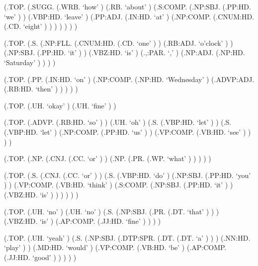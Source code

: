 \documentclass[10pt]{article}
\begin{document}
\begin{parsetree}  (.TOP. (.SUGG. (.WRB. `how' ) (.RB. `about' ) (.S:COMP. (.NP:SBJ. (.PP:HD. `we' ) ) (.VBP:HD. `leave' ) (.PP:ADJ. (.IN:HD. `at' ) (.NP:COMP. (.CNUM:HD. (.CD. `eight' ) ) ) ) ) ) ) \end{parsetree}

\begin{parsetree}  (.TOP. (.S. (.NP:FLL. (.CNUM:HD. (.CD. `one' ) ) (.RB:ADJ. `o'clock' ) ) (.NP:SBJ. (.PP:HD. `it' ) ) (.VBZ:HD. `is' ) (.,:PAR. `,' ) (.NP:ADJ. (.NP:HD. `Saturday' ) ) ) ) \end{parsetree}

\begin{parsetree}  (.TOP. (.PP. (.IN:HD. `on' ) (.NP:COMP. (.NP:HD. `Wednesday' ) (.ADVP:ADJ. (.RB:HD. `then' ) ) ) ) ) \end{parsetree}

\begin{parsetree}  (.TOP. (.UH. `okay' ) (.UH. `fine' ) ) \end{parsetree}

\begin{parsetree}  (.TOP. (.ADVP. (.RB:HD. `so' ) ) (.UH. `oh' ) (.S. (.VBP:HD. `let' ) ) (.S. (.VBP:HD. `let' ) (.NP:COMP. (.PP:HD. `us' ) ) (.VP:COMP. (.VB:HD. `see' ) ) ) ) \end{parsetree}

\begin{parsetree}  (.TOP. (.NP. (.CNJ. (.CC. `or' ) ) (.NP. (.PR. (.WP. `what' ) ) ) ) ) \end{parsetree}

\begin{parsetree}  (.TOP. (.S. (.CNJ. (.CC. `or' ) ) (.S. (.VBP:HD. `do' ) (.NP:SBJ. (.PP:HD. `you' ) ) (.VP:COMP. (.VB:HD. `think' ) (.S:COMP. (.NP:SBJ. (.PP:HD. `it' ) ) (.VBZ:HD. `is' ) ) ) ) ) ) \end{parsetree}

\begin{parsetree}  (.TOP. (.UH. `no' ) (.UH. `no' ) (.S. (.NP:SBJ. (.PR. (.DT. `that' ) ) ) (.VBZ:HD. `is' ) (.AP:COMP. (.JJ:HD. `fine' ) ) ) ) \end{parsetree}

\begin{parsetree}  (.TOP. (.UH. `yeah' ) (.S. (.NP:SBJ. (.DTP:SPR. (.DT. (.DT. `a' ) ) ) (.NN:HD. `play' ) ) (.MD:HD. `would' ) (.VP:COMP. (.VB:HD. `be' ) (.AP:COMP. (.JJ:HD. `good' ) ) ) ) ) \end{parsetree}
\end{document}
